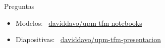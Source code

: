 \begingroup
{}
\begin{frame}{Preguntas}
    \vfill
    \begin{itemize}
        \item Modelos: \faGithub\ \href{https://github.com/daviddavo/upm-tfm-notebooks}{daviddavo/upm-tfm-notebooks}
        \item Diapositivas: \faGithub\ \href{https://github.com/daviddavo/upm-tfm-presentacion}{daviddavo/upm-tfm-presentacion}
    \end{itemize}
    \vfill
    \vspace{25mm}
    \doclicenseThis
\end{frame}
\endgroup
